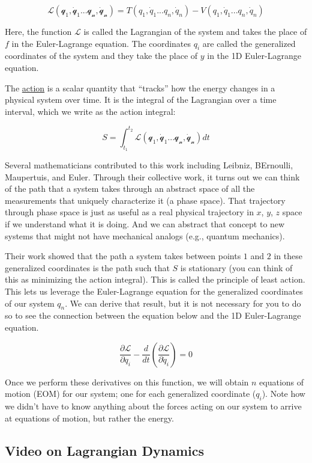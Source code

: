 \[
\mathcal{L(q_1,\dot{q}_1... q_n,\dot{q}_n)} = T(q_1,\dot{q}_1... q_n,\dot{q}_n) - V(q_1,\dot{q}_1... q_n,\dot{q}_n)
\]

Here, the function \(\mathcal{L}\) is called the Lagrangian of the
system and takes the place of \(f\) in the Euler-Lagrange equation. The
coordinates \(q_i\) are called the generalized coordinates of the system
and they take the place of \(y\) in the 1D Euler-Lagrange equation.

The \href{https://en.wikipedia.org/wiki/Action_(physics)}{action} is a
scalar quantity that ``tracks'' how the energy changes in a physical
system over time. It is the integral of the Lagrangian over a time
interval, which we write as the action integral:

\[
S = \int_{t_1}^{t_2} \mathcal{L(q_1,\dot{q}_1... q_n,\dot{q}_n)} dt
\]

Several mathematicians contributed to this work including Leibniz,
BErnoulli, Maupertuis, and Euler. Through their collective work, it
turns out we can think of the path that a system takes through an
abstract space of all the measurements that uniquely characterize it (a
phase space). That trajectory through phase space is just as useful as a
real physical trajectory in \(x\), \(y\), \(z\) space if we understand
what it is doing. And we can abstract that concept to new systems that
might not have mechanical analogs (e.g., quantum mechanics).

Their work showed that the path a system takes between points \(1\) and
\(2\) in these generalized coordinates is the path such that \(S\) is
stationary (you can think of this as minimizing the action integral).
This is called the principle of least action. This lets us leverage the
Euler-Lagrange equation for the generalized coordinates of our system
\(q_n\). We can derive that result, but it is not necessary for you to
do so to see the connection between the equation below and the 1D
Euler-Lagrange equation.

\[
\frac{\partial \mathcal{L}}{\partial q_i} - \frac{d}{dt}\left(\frac{\partial \mathcal{L}}{\partial \dot{q}_i} \right) = 0
\]

Once we perform these derivatives on this function, we will obtain \(n\)
equations of motion (EOM) for our system; one for each generalized
coordinate (\(q_i\)). Note how we didn't have to know anything about the
forces acting on our system to arrive at equations of motion, but rather
the energy.

\subsection{Video on Lagrangian
Dynamics}\label{video-on-lagrangian-dynamics}

